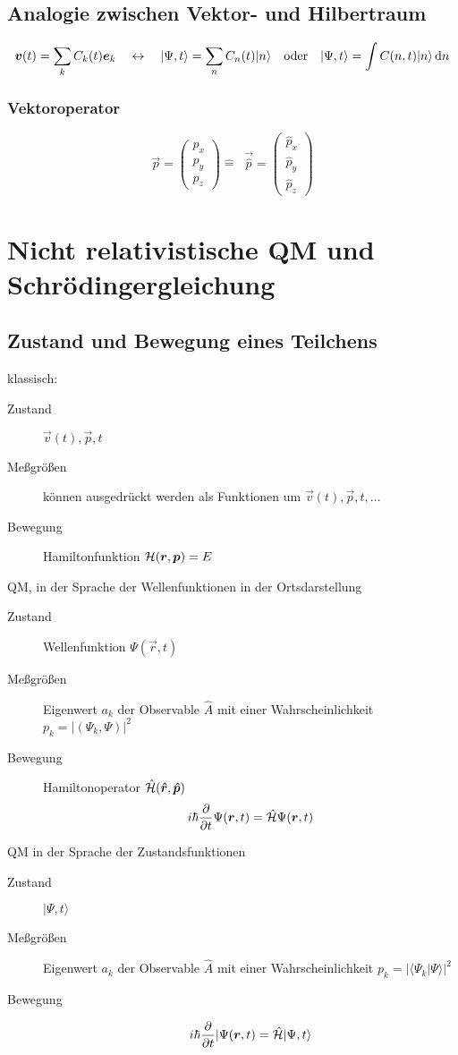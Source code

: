 \subsection{Analogie zwischen Vektor- und Hilbertraum}
$$\bm{v}(t) = \sum_k C_k (t) \bm{e}_k \quad \leftrightarrow \quad |\Psi,t\rangle = \sum_n C_n (t) |n\rangle \quad \textrm{oder} \quad |\Psi,t\rangle = \int C(n,t)|n\rangle\mathop{}\!\mathrm{d} n$$

\subsubsection{Vektoroperator}
$$\vec{p} = \begin{pmatrix} p_x \\ p_y \\ p_z \end{pmatrix} \hat = \mathop{} \vec{\hat p} = \begin{pmatrix}\hat p_x \\ \hat p_y \\ \hat p_z \end{pmatrix}$$
\section{Nicht relativistische QM und Schrödingergleichung}
\subsection{Zustand und Bewegung eines Teilchens}

klassisch:
\begin{description}
	\item[Zustand] $\vec{v}(t), \vec{p}, t$
	\item[Meßgrößen] können ausgedrückt werden als Funktionen um $\vec{v}(t), \vec{p}, t, \dots$
	\item[Bewegung] Hamiltonfunktion $\mathcal{H}(\bm{r},\bm{p}) = E$
\end{description}
QM, in der Sprache der Wellenfunktionen in der Ortsdarstellung
\begin{description}
	\item[Zustand] Wellenfunktion $\Psi(\vec{r},t)$
	\item[Meßgrößen] Eigenwert $a_k$ der Observable $\hat A$ mit einer Wahrscheinlichkeit $p_k = |(\Psi_k, \Psi)|^2$
	\item[Bewegung] Hamiltonoperator $\hat {\mathcal{H}}(\bm{\hat r},\bm{\hat p})$
	$$i \hbar \frac{\partial }{\partial t} \Psi(\bm{r}, t) = \hat {\mathcal{H}} \Psi(\bm{r}, t)$$
\end{description}
QM in der Sprache der Zustandsfunktionen
\begin{description}
	\item[Zustand] $|\Psi,t\rangle$
	\item[Meßgrößen] Eigenwert $a_k$ der Observable $\hat A$ mit einer Wahrscheinlichkeit $p_k = |\langle\Psi_k | \Psi\rangle|^2$
	\item[Bewegung] $$i \hbar \frac{\partial }{\partial t} | \Psi(\bm{r}, t) = \hat {\mathcal{H}} |\Psi,t\rangle$$
\end{description}

